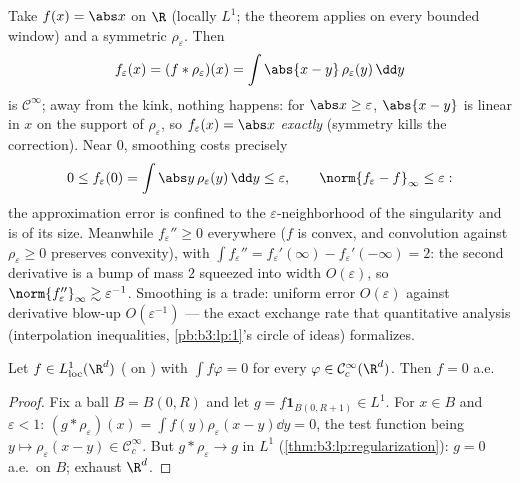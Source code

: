 \begin{example}
\label{ex:b3:lp:mollifyexample}
Take $f(x) = \abs x$ on $\R$ (locally $L^1$; the theorem
applies on every bounded window) and a symmetric 
$\rho_\varepsilon$. Then
\[
f_\varepsilon(x) = (f * \rho_\varepsilon)(x)
= \int\abs{x - y}\,\rho_\varepsilon(y)\,\dd y
\]
is $\mathcal C^\infty$; away from the kink, nothing happens:
for $\abs x \geq \varepsilon$, $\abs{x - y}$ is linear in $x$
on the support of $\rho_\varepsilon$, so $f_\varepsilon(x) =
\abs x$ \emph{exactly} (symmetry kills the correction).
Near $0$, smoothing costs precisely
\[
0 \leq f_\varepsilon(0) = \int\abs
y\,\rho_\varepsilon(y)\,\dd y \leq \varepsilon,
\qquad
\norm{f_\varepsilon - f}_\infty \leq \varepsilon :
\]
the approximation error is confined to the
$\varepsilon$-neighborhood of the singularity and is of its
size. Meanwhile $f_\varepsilon'' \geq 0$ everywhere
($f$ is convex, and convolution against $\rho_\varepsilon
\geq 0$ preserves convexity), with $\int f_\varepsilon'' =
f_\varepsilon'(\infty) - f_\varepsilon'(-\infty) = 2$: the
second derivative is a bump of mass $2$ squeezed into width
$O(\varepsilon)$, so $\norm{f_\varepsilon''}_\infty \gtrsim
\varepsilon^{-1}$. Smoothing is a trade: uniform error
$O(\varepsilon)$ against derivative blow-up
$O(\varepsilon^{-1})$ --- the exact exchange rate that
quantitative analysis (interpolation inequalities,
\cref{pb:b3:lp:1}'s circle of ideas) formalizes.
\end{example}

\begin{corollary}\label{cor:b3:lp:fundlemma}
Let $f \in L^1_{\mathrm{loc}}(\R^d)$ ( on )
with $\int f\varphi = 0$ for every $\varphi \in \mathcal
C^\infty_c(\R^d)$. Then $f = 0$ a.e.
\end{corollary}

\begin{proof}
Fix a ball $B = B(0, R)$ and let $g = f\mathbf 1_{B(0, R+1)}
\in L^1$. For $x \in B$ and $\varepsilon < 1$: $(g *
\rho_\varepsilon)(x) = \int f(y)\rho_\varepsilon(x - y)\dd y =
0$, the test function being $y \mapsto \rho_\varepsilon(x-y)
\in \mathcal C_c^\infty$. But $g * \rho_\varepsilon \to g$ in
$L^1$ (\cref{thm:b3:lp:regularization}): $g = 0$ a.e.\ on $B$;
exhaust $\R^d$.
\end{proof}

